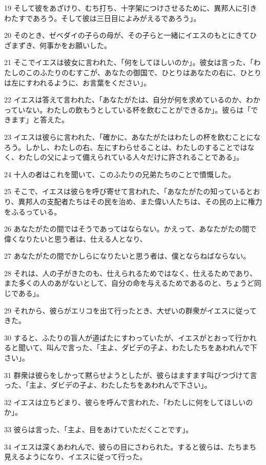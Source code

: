\par 19 そして彼をあざけり、むち打ち、十字架につけさせるために、異邦人に引きわたすであろう。そして彼は三日目によみがえるであろう」。
\par 20 そのとき、ゼベダイの子らの母が、その子らと一緒にイエスのもとにきてひざまずき、何事かをお願いした。
\par 21 そこでイエスは彼女に言われた、「何をしてほしいのか」。彼女は言った、「わたしのこのふたりのむすこが、あなたの御国で、ひとりはあなたの右に、ひとりは左にすわれるように、お言葉をください」。
\par 22 イエスは答えて言われた、「あなたがたは、自分が何を求めているのか、わかっていない。わたしの飲もうとしている杯を飲むことができるか」。彼らは「できます」と答えた。
\par 23 イエスは彼らに言われた、「確かに、あなたがたはわたしの杯を飲むことになろう。しかし、わたしの右、左にすわらせることは、わたしのすることではなく、わたしの父によって備えられている人々だけに許されることである」。
\par 24 十人の者はこれを聞いて、このふたりの兄弟たちのことで憤慨した。
\par 25 そこで、イエスは彼らを呼び寄せて言われた、「あなたがたの知っているとおり、異邦人の支配者たちはその民を治め、また偉い人たちは、その民の上に権力をふるっている。
\par 26 あなたがたの間ではそうであってはならない。かえって、あなたがたの間で偉くなりたいと思う者は、仕える人となり、
\par 27 あなたがたの間でかしらになりたいと思う者は、僕とならねばならない。
\par 28 それは、人の子がきたのも、仕えられるためではなく、仕えるためであり、また多くの人のあがないとして、自分の命を与えるためであるのと、ちょうど同じである」。
\par 29 それから、彼らがエリコを出て行ったとき、大ぜいの群衆がイエスに従ってきた。
\par 30 すると、ふたりの盲人が道ばたにすわっていたが、イエスがとおって行かれると聞いて、叫んで言った、「主よ、ダビデの子よ、わたしたちをあわれんで下さい」。
\par 31 群衆は彼らをしかって黙らせようとしたが、彼らはますます叫びつづけて言った、「主よ、ダビデの子よ、わたしたちをあわれんで下さい」。
\par 32 イエスは立ちどまり、彼らを呼んで言われた、「わたしに何をしてほしいのか」。
\par 33 彼らは言った、「主よ、目をあけていただくことです」。
\par 34 イエスは深くあわれんで、彼らの目にさわられた。すると彼らは、たちまち見えるようになり、イエスに従って行った。

